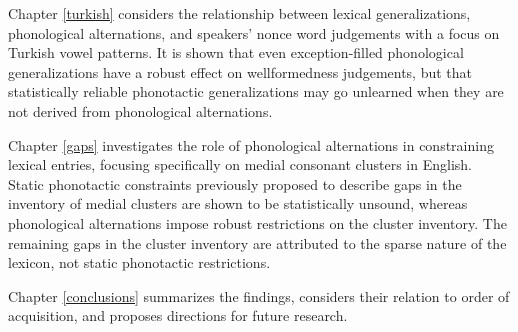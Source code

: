 Chapter \ref{turkish} considers the relationship between lexical generalizations, phonological alternations, and speakers' nonce word judgements with a focus on Turkish vowel patterns. 
It is shown that even exception-filled phonological generalizations have a robust effect on wellformedness judgements, but that statistically reliable phonotactic generalizations may go unlearned when they are not derived from phonological alternations.

Chapter \ref{gaps} investigates the role of phonological alternations in constraining lexical entries, focusing specifically on medial consonant clusters in English. 
Static phonotactic constraints previously proposed to describe gaps in the inventory of medial clusters are shown to be statistically unsound, whereas phonological alternations impose robust restrictions on the cluster inventory. 
The remaining gaps in the cluster inventory are attributed to the sparse nature of the lexicon, not static phonotactic restrictions.

Chapter \ref{conclusions} summarizes the findings, considers their relation to order of acquisition, and proposes directions for future research.

